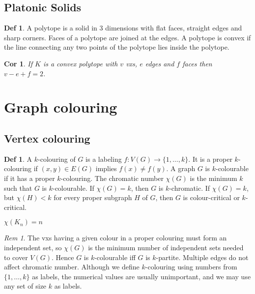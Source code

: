 \documentclass[11pt, fleqn, a4paper, landscape]{article}
\theoremstyle{plain} %
\newtheorem{cor}[thm]{Cor}
\theoremstyle{remark} %
\newtheorem{rem}[thm]{Rem}
\theoremstyle{definition} %
\newtheorem{defi}[thm]{Def}
\begin{document}
\begin{multicols}{5}
\subsection{Platonic Solids}

\begin{defi}
A polytope is a solid in 3 dimensions with flat faces, straight edges and sharp corners. Faces of a polytope are joined at the edges. A polytope is convex if the line connecting any two points of the polytope lies inside the polytope.
\end{defi}
\addtocounter{thm}{1}
\addtocounter{thm}{1}

\begin{cor}
If $K$ is a convex polytope with $v$ vxs, $e$ edges and $f$ faces then $v - e + f = 2$.
\end{cor}

\section{Graph colouring}
\subsection{Vertex colouring}

\begin{defi}
A $k$-colouring of $G$ is a labeling $f : V (G) \to \{1, \dots , k\}$. It is a proper $k$-colouring if $(x, y) \in E(G)$ implies $f(x) \ne f(y)$. A graph $G $ is $k$-colourable if it has a proper $k$-colouring. The
chromatic number $\chi(G)$ is the minimum $k$ such that $G$ is $k$-colourable. If $\chi(G) = k$, then $G$ is
$k$-chromatic. If $\chi(G) = k$, but $\chi(H) < k$ for every proper subgraph $H$ of $G$, then $G$ is colour-critical or $k$-critical.

$\chi(K_n) = n$
\end{defi}
\addtocounter{thm}{1}
\begin{rem}
The vxs having a given colour in a proper colouring must form an independent set, so $\chi(G)$ is the minimum number of independent sets needed to cover $V (G).$ Hence $G$ is $k$-colourable iff $G$ is $k$-partite. Multiple edges do not affect chromatic number. Although we define
$k$-colouring using numbers from $\{1, \dots , k\}$ as labels, the numerical values are usually unimportant, and we may use any set of size $k$ as labels.
\end{rem}


\end{multicols}
\end{document}
